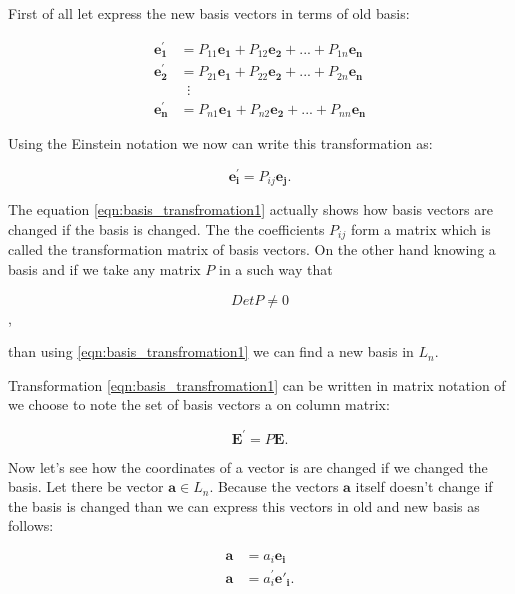 \documentclass{book}
\begin{document}
First of all let express the new basis vectors in terms of old basis:

\begin{equation}
\label{eqn:basis_transfromation}
\begin{split} 
\boldsymbol{e^{'}_1} &= P_{11}\boldsymbol{e_1} + P_{12}\boldsymbol{e_2} + ... + P_{1n}\boldsymbol{e_n} \\
\boldsymbol{e^{'}_2} &= P_{21}\boldsymbol{e_1} + P_{22}\boldsymbol{e_2} + ... + P_{2n}\boldsymbol{e_n} \\
 &\;\;\vdots \\
\boldsymbol{e^{'}_n} &= P_{n1}\boldsymbol{e_1} + P_{n2}\boldsymbol{e_2} + ... + P_{nn}\boldsymbol{e_n}
\end{split}
\end{equation}

Using the Einstein notation we now can write this transformation as:

\begin{equation}
\label{eqn:basis_transfromation1}
\boldsymbol{e^{'}_i} = P_{ij}\boldsymbol{e_j}.
\end{equation}

The equation \eqref{eqn:basis_transfromation1} actually shows how basis vectors are changed if the basis is changed. The the coefficients $P_{ij}$ form a matrix which is called the transformation matrix of basis vectors. On the other hand knowing a basis and if we take any matrix $P$ in a such way that 

\[Det P \neq 0\],

than using \eqref{eqn:basis_transfromation1} we can find a new basis in $L_n$.

Transformation \eqref{eqn:basis_transfromation1} can be written in matrix notation of we choose to note the set of basis vectors a on column matrix:

\begin{equation}
\label{eqn:basis_transfromation2}
\boldsymbol{E^{'}} = P\boldsymbol{E}.
\end{equation}

Now let's see how the coordinates of a vector is are changed if we changed the basis. Let there be vector $\boldsymbol{a} \in L_n$. Because the vectors $\boldsymbol{a}$ itself doesn't change if the basis is changed than we can express this vectors in old and new basis as follows:

\begin{align*}
\boldsymbol{a} &= a_i\boldsymbol{e_i} \\ \boldsymbol{a} &= a^{'}_i\boldsymbol{e{'}_i}.
\end{align*}
\end{document}
